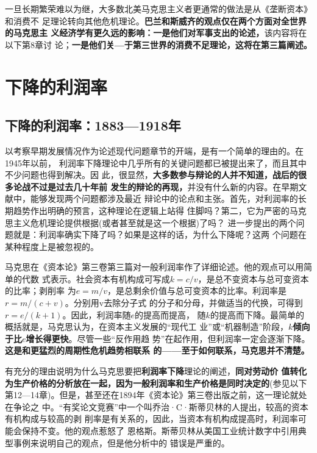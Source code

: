 一旦长期繁荣难以为继，大多数北美马克思主义者更通常的做法是从《垄断资本》和消费不
足理论转向其他危机理论。\textbf{巴兰和斯威齐的观点仅在两个方面对全世界的马克思主
  义经济学有更久远的影响：一是他们对军事支出的论述，}该内容将在以下第8章讨
论；\textbf{一是他们关—于第三世界的消费不足理论，这将在第三篇阐述。}


\chapter{下降的利润率}
\section{下降的利润率：1883—1918年}
以考察早期发展情况作为论述现代问题章节的开端，是有一个简单的理由的。在1945年以前，
利润率下降理论中几乎所有的关键问题都已被提出来了，而且其中不少问题也得到解决。因
此，很显然，\textbf{大多数参与辩论的人并不知道，战后的很多论战不过是过去几十年前
  发生的辩论的再现，}并没有什么新的内容。在早期文献中，能够发现两个问题都涉及最近
辩论中的论点和主张。首先，对利润率的长期趋势作出明确的预言，这种理论在逻辑上站得
住脚吗？第二，它为严密的马克思主义危机理论提供根据(或者甚至就是这一个根据)了吗？
进一步提出的两个问题就是：利润率确实下降了吗？如果是这样的话，为什么下降呢？这两
个问题在某种程度上是被忽视的。

马克思在《资本论》第三卷第三篇对一般利润率作了详细论述。他的观点可以用简单的代数
式表示。社会资本有机构成可写成$k=c/v$，是总不变资本与总可变资本的比率；剥削率
为$e=m/v$，是总剩余价值与总可变资本的比率。利润率是$r=m/(c+v)$。分别用v去除分子式
的分子和分母，并做适当的代换，可得到$r =e/(k+1)$。因此，利润率随$e$的提高而提高，
随$k$的提高而下降。最简单的概括就是，马克思认为，在资本主义发展的“现代工
业”或“机器制造”阶段，\textbf{$k$倾向于比$e$增长得更快}。尽管一些“反作用趋
势”在起作用，但利润率一定会逐渐下降。\textbf{这是和更猛烈的周期性危机趋势相联系
  的——至于如何联系，马克思并不清楚。}

有充分的理由说明为什么马克思要把\textbf{利润率下降}理论的阐述，\textbf{同对劳动价
  值转化为生产价格的分析放在一起，因为一般利润率和生产价格是同时决定的}(参见以下
第12—14章)。但是，甚至还在1894年《资本论》第三卷出版之前，这一理论就处在争论之
中。“有奖论文竞赛”中一个叫乔治·C·斯蒂贝林的人提出，较高的资本有机构成与较高的剥
削率是有关系的，因此，当资本有机构成提高时，利润率可能会保持不变。他的观点惹怒了
恩格斯。斯蒂贝林从美国工业统计数字中引用典型事例来说明自己的观点，但是他分析中的
错误是严重的。

